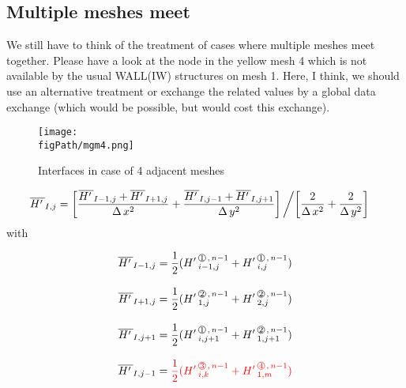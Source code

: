 \subsection{Multiple meshes meet}
\noindent We still have to think of the treatment of cases where multiple meshes meet together. Please have a look at the node in the yellow mesh 4 which is not available by the usual WALL(IW) structures on mesh 1. Here, I think, we should use an alternative treatment or exchange the related values by a global data exchange (which would be possible, but would cost this exchange).

\begin{figure}[H]
\begin{center}
\texttt{[image: \\figPath/mgm4.png]}
\end{center}
\caption{Interfaces in case of 4 adjacent meshes}
\label{FIG_InterfaceFour}
\end{figure}

\begin{align}  
\overline{{H'\,}}_{I,j} &=  \left[\frac{\overline{{H'\,}}_{I-1,j} + \overline{{H'\,}}_{I+1,j}}{\Delta \, x^2}  +  \frac{\overline{{H'\,}}_{I,j-1}  + \overline{{H'\,}}_{I,j+1}}{\Delta \, y^2}\right] \biggl/ \left[\frac{2 }{\Delta \, x^2}  +  \frac{2 }{\Delta \, y^2}\right] \nonumber  
\end{align}
\noindent with

\begin{align}  
\HBO{I-1,j}  &= \frac{1}{2} (\HL{i-1,j}{1}{n-1} + \HL{i,j}{1}{n-1})  \nonumber \\[2ex]
\HBO{I+1,j} &= \frac{1}{2} (\HL{1,j}{2}{n-1} + \HL{2,j}{2}{n-1}) \nonumber \\[2ex]
\HBO{I,j+1} &= \frac{1}{2} (\HL{i,j+1}{1}{n-1} + \HL{1,j+1}{2}{n-1}) \nonumber \\[2ex]
\HBO{I,j-1} &= \color{red} {\frac{1}{2} (\HL{i,k}{3}{n-1} + \HL{1,m}{4}{n-1})} \nonumber \\[2ex]
\end{align}  



